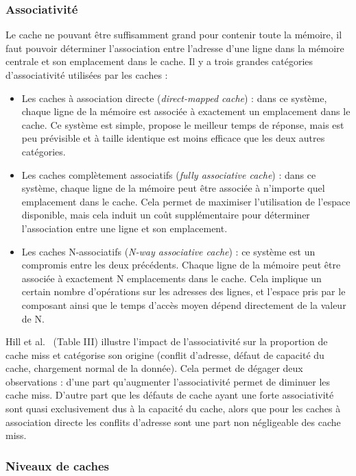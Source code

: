 \subsubsection{Associativité}

Le cache ne pouvant être suffisamment grand pour contenir toute la mémoire, il faut pouvoir déterminer l'association entre l'adresse d'une ligne dans la mémoire centrale et son emplacement dans le cache.
Il y a trois grandes catégories d'associativité utilisées par les caches :
\begin{itemize}
  \item Les caches à association directe (\emph{direct-mapped cache}) : dans ce système, chaque ligne de la mémoire est associée à exactement un emplacement dans le cache.
    Ce système est simple, propose le meilleur temps de réponse, mais est peu prévisible et à taille identique est moins efficace que les deux autres catégories.
  \item Les caches complètement associatifs (\emph{fully associative cache}) : dans ce système, chaque ligne de la mémoire peut être associée à n'importe quel emplacement dans le cache.
    Cela permet de maximiser l'utilisation de l'espace disponible, mais cela induit un coût supplémentaire pour déterminer l'association entre une ligne et son emplacement.
  \item Les caches N-associatifs (\emph{N-way associative cache}) : ce système est un compromis entre les deux précédents.
    Chaque ligne de la mémoire peut être associée à exactement N emplacements dans le cache.
    Cela implique un certain nombre d'opérations sur les adresses des lignes, et l'espace pris par le composant ainsi que le temps d'accès moyen dépend directement de la valeur de N.
\end{itemize}

Hill et al.~\cite{Hill1989} (Table III) illustre l'impact de l'associativité sur la proportion de cache miss et catégorise son origine (conflit d'adresse, défaut de capacité du cache, chargement normal de la donnée).
Cela permet de dégager deux observations : d'une part qu'augmenter l'associativité permet de diminuer les cache miss.
D'autre part que les défauts de cache ayant une forte associativité sont quasi exclusivement dus à la capacité du cache, alors que pour les caches à association directe les conflits d'adresse sont une part non négligeable des cache miss.

\subsubsection{Niveaux de caches}

